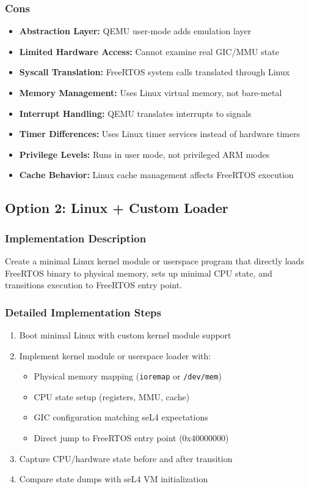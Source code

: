 \documentclass[11pt,a4paper]{article}
\begin{document}
\subsubsection{Cons}
\begin{itemize}
    \item \textbf{Abstraction Layer:} QEMU user-mode adds emulation layer
    \item \textbf{Limited Hardware Access:} Cannot examine real GIC/MMU state
    \item \textbf{Syscall Translation:} FreeRTOS system calls translated through Linux
    \item \textbf{Memory Management:} Uses Linux virtual memory, not bare-metal
    \item \textbf{Interrupt Handling:} QEMU translates interrupts to signals
    \item \textbf{Timer Differences:} Uses Linux timer services instead of hardware timers
    \item \textbf{Privilege Levels:} Runs in user mode, not privileged ARM modes
    \item \textbf{Cache Behavior:} Linux cache management affects FreeRTOS execution
\end{itemize}

\subsection{Option 2: Linux + Custom Loader}

\subsubsection{Implementation Description}
Create a minimal Linux kernel module or userspace program that directly loads FreeRTOS binary to physical memory, sets up minimal CPU state, and transitions execution to FreeRTOS entry point.

\subsubsection{Detailed Implementation Steps}
\begin{enumerate}
    \item Boot minimal Linux with custom kernel module support
    \item Implement kernel module or userspace loader with:
        \begin{itemize}
            \item Physical memory mapping (\texttt{ioremap} or \texttt{/dev/mem})
            \item CPU state setup (registers, MMU, cache)
            \item GIC configuration matching seL4 expectations
            \item Direct jump to FreeRTOS entry point (0x40000000)
        \end{itemize}
    \item Capture CPU/hardware state before and after transition
    \item Compare state dumps with seL4 VM initialization
\end{enumerate}
\end{document}
